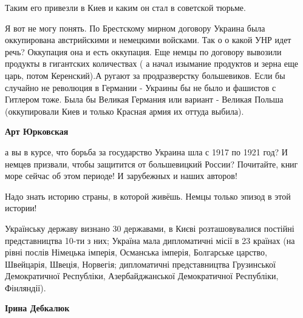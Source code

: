 \begin{itemize}
\begin{itemize}
Таким его привезли в Киев и каким он стал в советской тюрьме.

\end{itemize} %


Я вот не могу понять. По Брестскому мирном договору Украина была оккупирована
австрийскими и немецкими войсками. Так о о какой УНР идет речь? Оккупация она и
есть оккупация. Еще немцы по договору вывозили продукты в гигантских количествах
( а начал изымание продуктов и зерна еще царь, потом Керенский).А ругают за
продразверстку большевиков. Если бы случайно не революция в Германии - Украины
бы не было и фашистов с Гитлером тоже. Была бы Великая Германия или вариант -
Великая Польша (оккупировали Киев и только Красная армия их оттуда выбила).

\begin{itemize} %
\textbf{Арт Юрковская} 

а вы в курсе, что борьба за государство Украина шла с 1917 по 1921 год? И
немцев призвали, чтобы защитится от большевицкий России? Почитайте, книг море
сейчас об этом периоде! И зарубежных и наших авторов!

Надо знать историю страны, в которой живёшь. Немцы только эпизод в этой
истории!

Українську державу визнано 30 державами, в Києві розташовувалися постійні
представництва 10-ти з них; Україна мала дипломатичні місії в 23 країнах (на
рівні послів Німецька імперія, Османська імперія, Болгарське царство,
Швейцарія, Швеція, Норвегія; дипломатичні представництва Грузинської
Демократичної Республіки, Азербайджанської Демократичної Республіки,
Фінляндії).

\begin{itemize} %
\textbf{Ірина Дебкалюк} 


\end{itemize}
\end{itemize}
\end{itemize}
